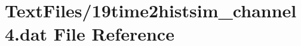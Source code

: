 \hypertarget{19time2histsim__channel4_8dat}{}\section{Text\+Files/19time2histsim\+\_\+channel4.dat File Reference}
\label{19time2histsim__channel4_8dat}
